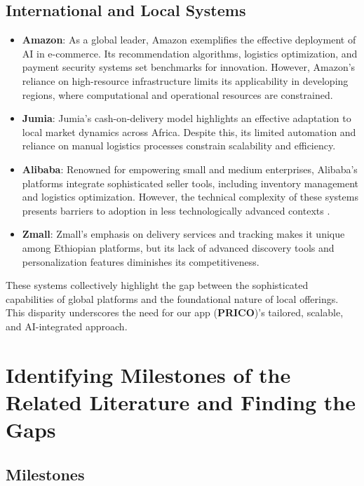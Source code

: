 \documentclass[12pt]{report}
\begin{document}
\subsection*{International and Local Systems}
\begin{itemize}
	\item \textbf{Amazon}: As a global leader, Amazon exemplifies the effective deployment of AI in
	      e-commerce. Its recommendation algorithms, logistics optimization, and payment
	      security systems set benchmarks for innovation. However, Amazon’s reliance on
	      high-resource infrastructure limits its applicability in developing regions, where
	      computational and operational resources are constrained. \cite{c16}
	\item \textbf{Jumia}: Jumia’s cash-on-delivery model highlights an effective adaptation to local
	      market dynamics across Africa. Despite this, its limited automation and reliance on
	      manual logistics processes constrain scalability and efficiency. \cite{c18}
	\item \textbf{Alibaba}: Renowned for empowering small and medium enterprises, Alibaba’s
	      platforms integrate sophisticated seller tools, including inventory management and
	      logistics optimization. However, the technical complexity of these systems presents
	      barriers to adoption in less technologically advanced contexts \cite{c17}.
	\item \textbf{Zmall}: Zmall’s emphasis on delivery services and tracking makes it unique among
	      Ethiopian platforms, but its lack of advanced discovery tools and personalization
	      features diminishes its competitiveness.
\end{itemize}

These systems collectively highlight the gap between the sophisticated capabilities of global
platforms and the foundational nature of local offerings. This disparity underscores the need
for our app (\textbf{PRICO})’s tailored, scalable, and AI-integrated approach.

\section{Identifying Milestones of the Related Literature and Finding the Gaps}

\subsection*{Milestones}
\end{document}
